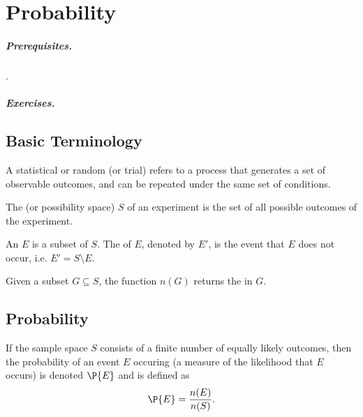 \chapter{Probability}\label{sec:Probability}

\paragraph{Prerequisites.} .
\paragraph{Exercises.} 

\section{Basic Terminology}

\begin{definition}
    A statistical or random  (or trial) refers to a process that generates a set of observable outcomes, and can be repeated under the same set of conditions.
\end{definition}

\begin{definition}
    The  (or possibility space) $S$ of an experiment is the set of all possible outcomes of the experiment.
\end{definition}

\begin{definition}
    An  $E$ is a subset of $S$. The  of $E$, denoted by $E'$, is the event that $E$ does not occur, i.e. $E' = S \setminus E$.
\end{definition}

\begin{definition}
    Given a subset $G \subseteq S$, the function $n(G)$ returns the  in $G$.
\end{definition}

\section{Probability}

\begin{definition}
    If the sample space $S$ consists of a finite number of equally likely outcomes, then the probability of an event $E$ occuring (a measure of the likelihood that $E$ occurs) is denoted $\P{E}$ and is defined as \[\P{E} = \frac{n(E)}{n(S)}.\]
\end{definition}

